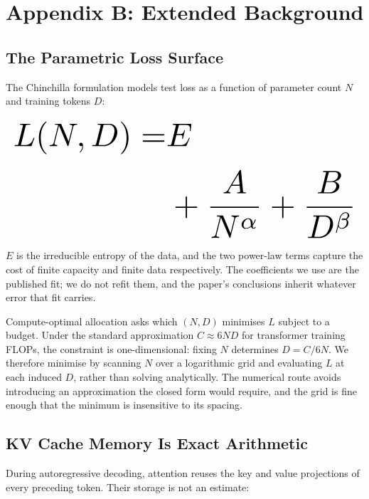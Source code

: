 \documentclass[10pt,journal,compsoc,twocolumn]{IEEEtran}
\begin{document}
\section{Appendix B: Extended Background}



\subsection{The Parametric Loss Surface}


The Chinchilla formulation models test loss as a function of parameter count $N$ and training tokens $D$:








\begin{equation}
\resizebox{\columnwidth}{!}{$\displaystyle
\begin{aligned}
L(N, D) = & E \\
& + \frac{A}{N^{\alpha}} + \frac{B}{D^{\beta}}
\end{aligned}
$}
\end{equation}








$E$ is the irreducible entropy of the data, and the two power-law terms capture the cost of finite capacity and finite data respectively. The coefficients we use are the published fit; we do not refit them, and the paper's conclusions inherit whatever error that fit carries.

Compute-optimal allocation asks which $(N, D)$ minimises $L$ subject to a budget. Under the standard approximation $C \approx 6ND$ for transformer training FLOPs, the constraint is one-dimensional: fixing $N$ determines $D = C / 6N$. We therefore minimise by scanning $N$ over a logarithmic grid and evaluating $L$ at each induced $D$, rather than solving analytically. The numerical route avoids introducing an approximation the closed form would require, and the grid is fine enough that the minimum is insensitive to its spacing.


\subsection{KV Cache Memory Is Exact Arithmetic}


During autoregressive decoding, attention reuses the key and value projections of every preceding token. Their storage is not an estimate:
\end{document}
